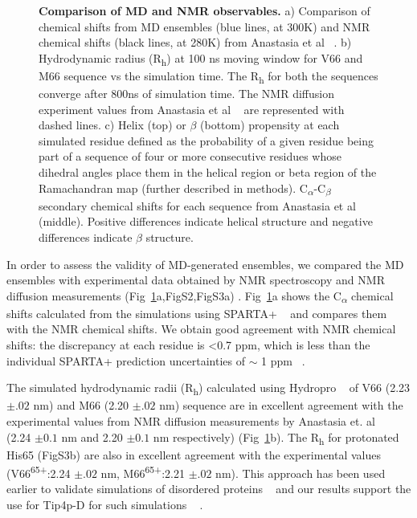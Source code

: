 \documentclass[journal=jacsat,manuscript=article]{achemso}
\begin{document}
\begin{figure}[!ht]
\caption{{\bf Comparison of MD and NMR observables.} a) Comparison of chemical shifts from MD ensembles (blue lines, at 300K) and NMR chemical shifts (black lines, at 280K) from Anastasia et al ~\cite{Anastasia2013}. b) Hydrodynamic radius (R\textsubscript{h}) at 100 ns moving  window for V66 and M66 sequence vs the simulation time. The R\textsubscript{h} for both the sequences converge after 800ns of simulation time. The NMR diffusion experiment values from Anastasia et al  ~\cite{Anastasia2013} are represented with dashed lines. c) Helix (top) or $\beta$ (bottom) propensity at each simulated residue defined as the probability of a given residue being part of a sequence of four or more consecutive residues whose dihedral angles place them in the helical region or beta region of the Ramachandran map (further described in methods). C\textsubscript{$\alpha$}-C\textsubscript{$\beta$} secondary chemical shifts for each sequence from Anastasia et al ~\cite{Anastasia2013} (middle). Positive differences indicate helical structure and negative differences indicate $\beta$ structure.}
\label{fig2} 
\end{figure}

In order to assess the validity of MD-generated ensembles, we compared the MD ensembles with experimental data obtained by NMR spectroscopy and NMR diffusion measurements (Fig~\ref{fig2}a,FigS2,FigS3a) . Fig~\ref{fig2}a shows the C\textsubscript{$\alpha$} chemical shifts calculated from the simulations using SPARTA+ ~\cite{Shen2010} and compares them with the NMR chemical shifts. We obtain good agreement with NMR chemical shifts: the discrepancy at each residue is \textless 0.7 ppm, which is less than the individual SPARTA+ prediction uncertainties of $\sim$ 1 ppm ~\cite{Shen2010}.


The simulated hydrodynamic radii (R\textsubscript{h}) calculated using Hydropro ~\cite {Ortega2011} of V66 (2.23 $\pm{.02}$ nm) and M66 (2.20 $\pm{.02}$ nm) sequence are in excellent agreement with the experimental values from NMR diffusion measurements by Anastasia et. al ~\cite{Anastasia2013} (2.24 $\pm{0.1}$ nm and 2.20 $\pm{0.1}$ nm respectively) (Fig~\ref{fig2}b). The R\textsubscript{h} for protonated His65 (FigS3b) are also in excellent agreement with the experimental values (V66\textsuperscript{65+}:2.24 $\pm{.02}$ nm, M66\textsuperscript{65+}:2.21 $\pm{.02}$ nm). This approach has been used earlier to validate simulations of disordered proteins ~\cite {Rauscher2015, Meng2018} and our results support the use for Tip4p-D for such simulations ~\cite {Piana2015, Robustelli2018} .
\end{document}
